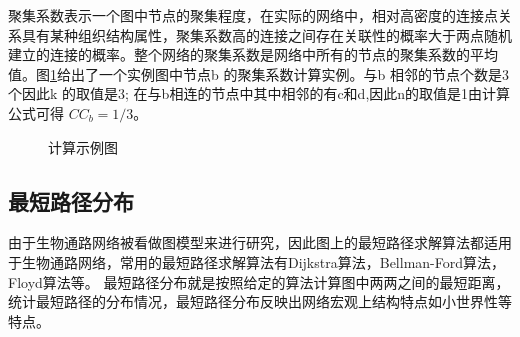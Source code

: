 
聚集系数表示一个图中节点的聚集程度，在实际的网络中，相对高密度的连接点关系具有某种组织结构属性，聚集系数高的连接之间存在关联性的概率大于两点随机建立的连接的概率。整个网络的聚集系数是网络中所有的节点的聚集系数的平均值。图\ref{fig24}给出了一个实例图中节点b 的聚集系数计算实例。与b 相邻的节点个数是3个因此k 的取值是3; 在与b相连的节点中其中相邻的有c和d,因此n的取值是1由计算公式可得 $CC_{b}=1/3$。


\begin{figure}{\label{fig1}}
  \centering
  \begin{minipage}{.95\linewidth}
    \setlength{\subfigcapskip}{-1bp}
    \centering
    \begin{minipage}{\textwidth}
      \centering
      \subfigure{\label{jujixishu}}\addtocounter{subfigure}{-2}
      \subfigure{\label{tuopuxishu}}\addtocounter{subfigure}{-2}
    \end{minipage}
	\caption[fig24]{计算示例图}
  \label{fig24}
  \end{minipage}
\end{figure}


\subsection{最短路径分布}
由于生物通路网络被看做图模型来进行研究，因此图上的最短路径求解算法都适用于生物通路网络，常用的最短路径求解算法有Dijkstra\cite{deng2012fuzzy}算法，Bellman-Ford\cite{goldberg1993heuristic}算法，Floyd\cite{floyd1962algorithm}算法等。
最短路径分布就是按照给定的算法计算图中两两之间的最短距离，统计最短路径的分布情况，最短路径分布反映出网络宏观上结构特点如小世界性等特点\cite{assenov2007computing}。

